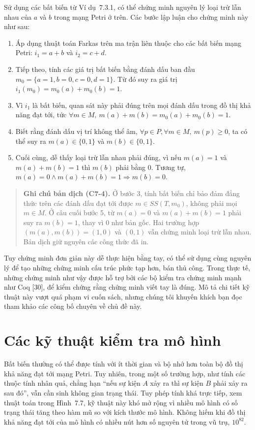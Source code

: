 Sử dụng các bất biến từ Ví dụ~7.3.1, có thể chứng minh nguyên lý loại trừ lẫn nhau của $a$ và $b$ trong mạng Petri ở trên. Các bước lập luận cho chứng minh này như sau:
\begin{enumerate}
\item Áp dụng thuật toán Farkas trên ma trận liên thuộc cho các bất biến mạng Petri: $i_1=a+b$ và $i_2=c+d$.
\item Tiếp theo, tính các giá trị bất biến bằng đánh dấu ban đầu $m_0=\{a=1,b=0,c=0,d=1\}$. Từ đó suy ra giá trị $i_1(m_0)=m_0(a)+m_0(b)=1$.
\item Vì $i_1$ là bất biến, quan sát này phải đúng trên mọi đánh dấu trong đồ thị khả năng đạt tới, tức $\forall m\in M,\ m(a)+m(b)=m_0(a)+m_0(b)=1$.
\item Biết rằng đánh dấu vị trí không thể âm, $\forall p\in P,\forall m\in M,\ m(p)\geqslant0$, ta có thể suy ra $m(a)\in\{0,1\}$ và $m(b)\in\{0,1\}$.
\item Cuối cùng, dễ thấy loại trừ lẫn nhau phải đúng, vì nếu $m(a)=1$ và $m(a)+m(b)=1$ thì $m(b)$ phải bằng 0. Tương tự, $m(a)=0\land m(a)+m(b)=1\Rightarrow m(b)=0$.
\end{enumerate}
\begin{quote}
\small\textbf{Ghi chú bản dịch (C7-4).} Ở bước 3, tính bất biến chỉ bảo đảm đẳng thức trên các đánh dấu đạt tới được $m\in SS(T,m_0)$, không phải mọi $m\in M$. Ở câu cuối bước 5, từ $m(a)=0$ và $m(a)+m(b)=1$ phải suy ra $m(b)=1$, thay vì 0 như bản gốc. Hai trường hợp $(m(a),m(b))=(1,0)$ và $(0,1)$ vẫn chứng minh loại trừ lẫn nhau. Bản dịch giữ nguyên các công thức đã in.
\end{quote}


Tuy chứng minh đơn giản này dễ thực hiện bằng tay, có thể sử dụng cùng nguyên lý để tạo những chứng minh cấu trúc phức tạp hơn, bán thủ công. Trong thực tế, những chứng minh như vậy được hỗ trợ bởi các bộ kiểm tra chứng minh mạnh như Coq [30], để kiểm chứng rằng chứng minh viết tay là đúng. Mô tả chi tiết kỹ thuật này vượt quá phạm vi cuốn sách, nhưng chúng tôi khuyến khích bạn đọc tham khảo các công bố chuyên về chủ đề này.

\section{Các kỹ thuật kiểm tra mô hình}
Bất biến thường có thể được tính với ít thời gian và bộ nhớ hơn toàn bộ đồ thị khả năng đạt tới mạng Petri. Tuy nhiên, trong một số trường hợp, như tính các thuộc tính nhân quả, chẳng hạn ``nếu sự kiện $A$ xảy ra thì sự kiện $B$ phải xảy ra sau đó'', vẫn cần sinh không gian trạng thái. Tuy phép tính khá trực tiếp, xem thuật toán trong Hình~7.7, kỹ thuật này khó mở rộng vì nhiều mô hình có số trạng thái tăng theo hàm mũ so với kích thước mô hình. Không hiếm khi đồ thị khả năng đạt tới của mô hình có nhiều nút hơn số nguyên tử trong vũ trụ, $10^{82}$.

